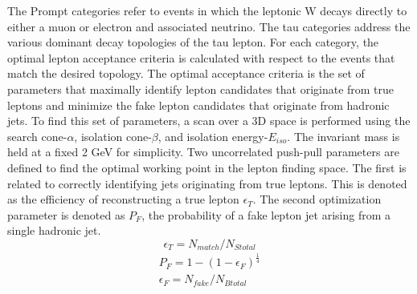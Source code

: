 The Prompt categories refer to events in which the leptonic W decays directly to either a muon or electron and associated neutrino. The tau categories address the various dominant decay topologies of the tau lepton. For each category, the optimal lepton acceptance criteria is calculated with respect to the events that match the desired topology. The optimal acceptance criteria is the set of parameters that maximally identify lepton candidates that originate from true leptons and minimize the fake lepton candidates that originate from hadronic jets. To find this set of parameters, a scan over a 3D space is performed using the search cone-$\alpha$, isolation cone-$\beta$, and isolation energy-$E_{iso}$. The invariant mass is held at a fixed 2 GeV for simplicity.
Two uncorrelated push-pull parameters are defined to find the optimal working point in the lepton finding space. The first is related to correctly identifying jets originating from true leptons. This is denoted as the efficiency of reconstructing a true lepton $\epsilon_T$. The second optimization parameter is denoted as $P_F$, the probability of a fake lepton jet arising from a single hadronic jet.  
\begin{equation}
\label{eq:et}
\epsilon_T = N_{match}/N_{Stotal}
\end{equation}
\begin{equation}
\begin{split}
\label{eq:pf}
P_F = 1-(1-\epsilon_F)^{\frac{1}{4}} \\
\epsilon_F = N_{fake}/N_{Btotal}
\end{split}
\end{equation}
